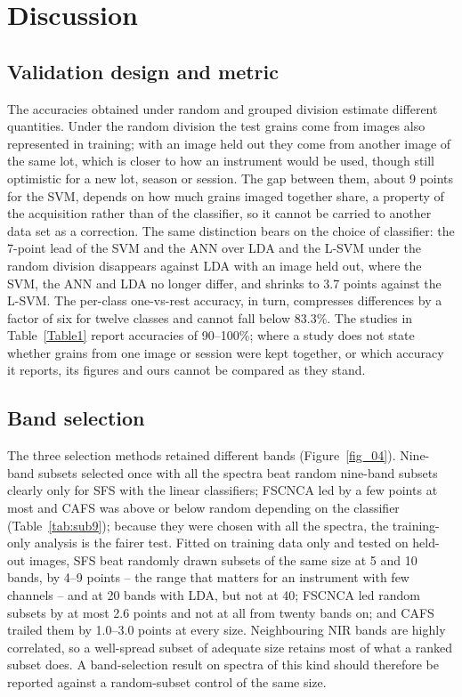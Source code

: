 \documentclass[final,5p,times,twocolumn]{elsarticle}
\newcommand{\added}[1]{{\color{blue}#1}}
\begin{document}
\added{\section{Discussion}\label{sec_discussion}

\subsection{Validation design and metric}
The accuracies obtained under random and grouped division estimate different quantities. Under the random division the test grains come from images also represented in training; with an image held out they come from another image of the same lot, which is closer to how an instrument would be used, though still optimistic for a new lot, season or session. The gap between them, about 9 points for the SVM, depends on how much grains imaged together share, a property of the acquisition rather than of the classifier, so it cannot be carried to another data set as a correction. The same distinction bears on the choice of classifier: the 7-point lead of the SVM and the ANN over LDA and the L-SVM under the random division disappears against LDA with an image held out, where the SVM, the ANN and LDA no longer differ, and shrinks to 3.7 points against the L-SVM. The per-class one-vs-rest accuracy, in turn, compresses differences by a factor of six for twelve classes and cannot fall below 83.3\%. The studies in Table~\ref{Table1} report accuracies of 90--100\%; where a study does not state whether grains from one image or session were kept together, or which accuracy it reports, its figures and ours cannot be compared as they stand.

\subsection{Band selection}
The three selection methods retained different bands (Figure~\ref{fig_04}). Nine-band subsets selected once with all the spectra beat random nine-band subsets clearly only for SFS with the linear classifiers; FSCNCA led by a few points at most and CAFS was above or below random depending on the classifier (Table~\ref{tab:sub9}); because they were chosen with all the spectra, the training-only analysis is the fairer test. Fitted on training data only and tested on held-out images, SFS beat randomly drawn subsets of the same size at 5 and 10 bands, by 4--9 points -- the range that matters for an instrument with few channels -- and at 20 bands with LDA, but not at 40; FSCNCA led random subsets by at most 2.6 points and not at all from twenty bands on; and CAFS trailed them by 1.0--3.0 points at every size. Neighbouring NIR bands are highly correlated, so a well-spread subset of adequate size retains most of what a ranked subset does. A band-selection result on spectra of this kind should therefore be reported against a random-subset control of the same size.

}
\end{document}
